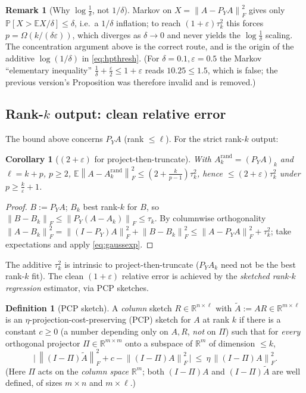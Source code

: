 \documentclass{amsart}
\newtheorem{corollary}{Corollary}
\theoremstyle{definition}
\newtheorem{definition}{Definition}
\newtheorem{remark}{Remark}
\newcommand{\R}{\mathbb{R}}
\newcommand{\Frob}[1]{\left\lVert #1\right\rVert_F}
\newcommand{\Atil}{\widetilde{A}}
\newcommand{\E}{\mathbb{E}}
\newcommand{\Prob}{\mathbb{P}}
\begin{document}
\begin{remark}[Why $\log\tfrac1\delta$, not $1/\delta$]\label{rem:nomarkov}
Markov on $X=\Frob{A-P_YA}^2$ gives only $\Prob[X>\E X/\delta]\le\delta$, i.e.\
a $1/\delta$ inflation; to reach $(1+\varepsilon)\tau_k^2$ this forces
$p=\Omega(k/(\delta\varepsilon))$, which diverges as $\delta\to0$ and never
yields the $\log\tfrac1\delta$ scaling. The concentration argument above is the
correct route, and is the origin of the additive $\log(1/\delta)$ in
\eqref{eq:hpthresh}. (For $\delta=0.1,\varepsilon=0.5$ the Markov ``elementary
inequality'' $\tfrac1\delta+\tfrac\varepsilon2\le1+\varepsilon$ reads
$10.25\le1.5$, which is false; the previous version's Proposition was therefore
invalid and is removed.)
\end{remark}

\subsection{Rank-$k$ output: clean relative error}\label{sec:rankk}

The bound above concerns $P_YA$ (rank $\le\ell$). For the strict rank-$k$ output:

\begin{corollary}[$(2+\varepsilon)$ for project-then-truncate]\label{cor:rankk}
With $A_k^{\mathrm{rand}}=(P_YA)_k$ and $\ell=k+p$, $p\ge2$,
$\E\Frob{A-A_k^{\mathrm{rand}}}^2\le(2+\tfrac{k}{p-1})\tau_k^2$, hence
$\le(2+\varepsilon)\tau_k^2$ under $p\ge\frac k\varepsilon+1$.
\end{corollary}

\begin{proof}
$B:=P_YA$; $B_k$ best rank-$k$ for $B$, so $\Frob{B-B_k}\le\Frob{P_Y(A-A_k)}
\le\tau_k$. By columnwise orthogonality
$\Frob{A-B_k}^2=\Frob{(I-P_Y)A}^2+\Frob{B-B_k}^2\le\Frob{A-P_YA}^2+\tau_k^2$;
take expectations and apply \eqref{eq:gaussexp}.
\end{proof}

The additive $\tau_k^2$ is intrinsic to project-then-truncate ($P_YA_k$ need not
be the best rank-$k$ fit). The clean $(1+\varepsilon)$ relative error is achieved
by the \emph{sketched rank-$k$ regression} estimator, via PCP sketches.

\begin{definition}[PCP sketch]\label{def:pcp}
A \emph{column} sketch $R\in\R^{n\times\ell}$ with $\Atil:=AR\in\R^{m\times\ell}$
is an $\eta$-projection-cost-preserving (PCP) sketch for $A$ at rank $k$ if there
is a constant $c\ge0$ (a number depending only on $A,R$, \emph{not} on $\Pi$)
such that for \emph{every} orthogonal projector $\Pi\in\R^{m\times m}$ onto a
subspace of $\R^m$ of dimension $\le k$,
\begin{equation}\label{eq:pcpdef}
\Big|\,\Frob{(I-\Pi)\Atil}^2+c-\Frob{(I-\Pi)A}^2\,\Big|\ \le\ \eta\,\Frob{(I-\Pi)A}^2 .
\end{equation}
(Here $\Pi$ acts on the \emph{column space} $\R^m$; both $(I-\Pi)A$ and
$(I-\Pi)\Atil$ are well defined, of sizes $m\times n$ and $m\times\ell$.)
\end{definition}
\end{document}
